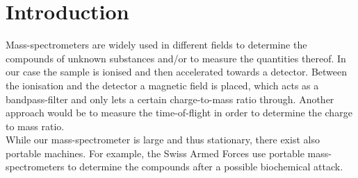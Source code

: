 \section{Introduction} \label{sec:introduction}
Mass-spectrometers are widely used in different fields to determine the compounds of unknown substances and/or to measure the quantities thereof. 
In our case the sample is ionised and then accelerated towards a detector. Between the ionisation and the detector a magnetic field is placed, which acts as a bandpass-filter and only lets a certain charge-to-mass ratio through. 
Another approach would be to measure the time-of-flight in order to determine the charge to mass ratio.\\
While our mass-spectrometer is large and thus stationary, there exist also portable machines. For example, the Swiss Armed Forces use portable mass-spectrometers to determine the compounds after a possible biochemical attack.
